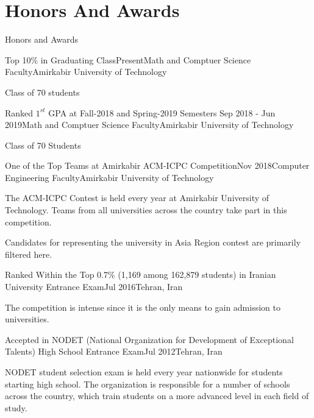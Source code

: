 \documentclass{resume} %
\begin{document}
	\section{Honors And Awards}
	\begin{rSection}{Honors and Awards}
		\begin{rSubsection}{Top 10\% in Graduating Class}{Present}{Math and Comptuer Science Faculty}{Amirkabir University of Technology}
			\item Class of 70 students
		\end{rSubsection}
		
		\begin{rSubsection}{Ranked $1^{st}$ GPA at Fall-2018 and Spring-2019 Semesters }{Sep 2018 - Jun 2019}{Math and Comptuer Science Faculty}{Amirkabir University of Technology}
			\item Class of 70 Students
		\end{rSubsection}	
		
		\begin{rSubsection}{One of the Top Teams at Amirkabir ACM-ICPC Competition}{Nov 2018}{Computer Engineering Faculty}{Amirkabir University of Technology}
			\item The ACM-ICPC Contest is held every year at Amirkabir University of Technology. Teams from all universities across the country take part in this competition.
			\item Candidates for representing the university in Asia Region contest are primarily filtered here.
		\end{rSubsection}
		
		\begin{rSubsection}{Ranked Within the Top 0.7\% (1,169 among 162,879 students) in Iranian University Entrance Exam}{Jul 2016}{Tehran, Iran }{ }
			\item The competition is intense since it is the only means to gain admission to universities.
		\end{rSubsection} 
		
		\begin{rSubsection}{Accepted in NODET (National Organization for Development of Exceptional Talents) High School Entrance Exam}{Jul 2012}{Tehran, Iran }{ }
			\item NODET student selection exam is held every year nationwide for students starting high school. The organization is responsible for a number of schools across the country, which train students on a more advanced level in each field of study.
		\end{rSubsection}
		
	\end{rSection}
\end{document}
